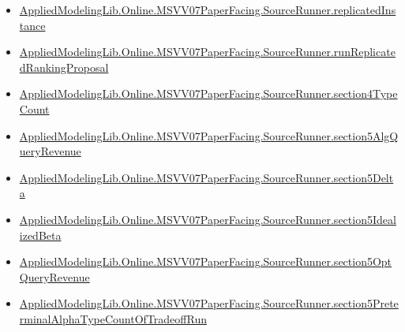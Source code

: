 \documentclass[10pt]{article}
\begin{document}
\begin{itemize}[leftmargin=1.2em]
\begin{itemize}[leftmargin=1.2em]
\item \hyperlink{paper-prerequisite-8364c561741f774b}{Applied\allowbreak{}Modeling\allowbreak{}Lib.\allowbreak{}Online.\allowbreak{}MSVV07\allowbreak{}Paper\allowbreak{}Facing.\allowbreak{}Source\allowbreak{}Runner.\allowbreak{}replicated\allowbreak{}Instance}
\item \hyperlink{paper-prerequisite-69f192f34b65f8c5}{Applied\allowbreak{}Modeling\allowbreak{}Lib.\allowbreak{}Online.\allowbreak{}MSVV07\allowbreak{}Paper\allowbreak{}Facing.\allowbreak{}Source\allowbreak{}Runner.\allowbreak{}run\allowbreak{}Replicated\allowbreak{}Ranking\allowbreak{}Proposal}
\item \hyperlink{paper-prerequisite-ecec1d4ea1517219}{Applied\allowbreak{}Modeling\allowbreak{}Lib.\allowbreak{}Online.\allowbreak{}MSVV07\allowbreak{}Paper\allowbreak{}Facing.\allowbreak{}Source\allowbreak{}Runner.\allowbreak{}section4\allowbreak{}Type\allowbreak{}Count}
\item \hyperlink{paper-prerequisite-6614623e33a6b961}{Applied\allowbreak{}Modeling\allowbreak{}Lib.\allowbreak{}Online.\allowbreak{}MSVV07\allowbreak{}Paper\allowbreak{}Facing.\allowbreak{}Source\allowbreak{}Runner.\allowbreak{}section5\allowbreak{}Alg\allowbreak{}Query\allowbreak{}Revenue}
\item \hyperlink{paper-prerequisite-9c42e972c792a480}{Applied\allowbreak{}Modeling\allowbreak{}Lib.\allowbreak{}Online.\allowbreak{}MSVV07\allowbreak{}Paper\allowbreak{}Facing.\allowbreak{}Source\allowbreak{}Runner.\allowbreak{}section5\allowbreak{}Delta}
\item \hyperlink{paper-prerequisite-f037482aa7280cbe}{Applied\allowbreak{}Modeling\allowbreak{}Lib.\allowbreak{}Online.\allowbreak{}MSVV07\allowbreak{}Paper\allowbreak{}Facing.\allowbreak{}Source\allowbreak{}Runner.\allowbreak{}section5\allowbreak{}Idealized\allowbreak{}Beta}
\item \hyperlink{paper-prerequisite-235ed37ae4a5d3a4}{Applied\allowbreak{}Modeling\allowbreak{}Lib.\allowbreak{}Online.\allowbreak{}MSVV07\allowbreak{}Paper\allowbreak{}Facing.\allowbreak{}Source\allowbreak{}Runner.\allowbreak{}section5\allowbreak{}Opt\allowbreak{}Query\allowbreak{}Revenue}
\item \hyperlink{paper-prerequisite-721f252b2952e397}{Applied\allowbreak{}Modeling\allowbreak{}Lib.\allowbreak{}Online.\allowbreak{}MSVV07\allowbreak{}Paper\allowbreak{}Facing.\allowbreak{}Source\allowbreak{}Runner.\allowbreak{}section5\allowbreak{}Preterminal\allowbreak{}Alpha\allowbreak{}Type\allowbreak{}Count\allowbreak{}Of\allowbreak{}Tradeoff\allowbreak{}Run}

\end{itemize}
\end{itemize}
\end{document}
